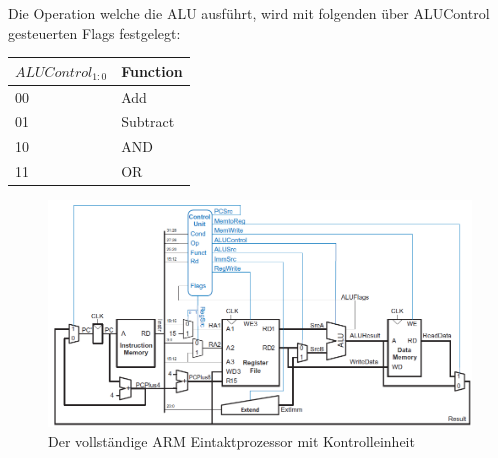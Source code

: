 \documentclass[a4paper,12pt,leqno]{article}
\begin{document}
Die Operation welche die ALU ausführt, wird mit folgenden über ALUControl gesteuerten Flags festgelegt:\\

\begin{tabular}{|l|l|}
\hline
$ALUControl_{1:0}$ & Function\\
\hline
00 & Add\\
01 & Subtract\\
10 & AND\\
11 & OR\\
\hline
\end{tabular}

\newpage

\begin{figure}[h!]
\centering
\includegraphics[scale=0.65]{Grafiken/Eintaktprozessor.png}
\caption{Der vollständige ARM Eintaktprozessor mit Kontrolleinheit}
\end{figure}
\end{document}
